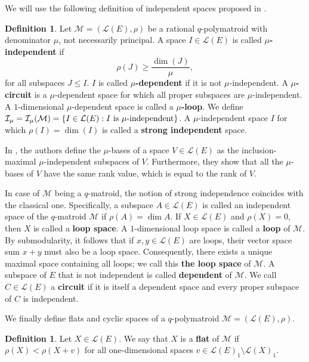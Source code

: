 \documentclass[a4paper,11pt,reqno]{amsart}
\theoremstyle{definition}
\newtheorem{definition}[theorem]{{{Definition}}}
\newcommand{\mM}{\mathcal{M}}
\newcommand{\mL}{\mathcal{L}}
\begin{document}
{We will use the following definition of independent spaces proposed in \cite[Def. 3.1]{gluesing2022independent}. 

\begin{definition}\label{def:indep_spaces}
Let $\mM = (\mL(E), \rho)$ be a rational $q$-polymatroid with denominator $\mu$, not necessarily principal.  A space $I\in\mL(E)$ is called \textbf{$\mu$-independent} if
$$\rho(J)\geq \frac{\dim(J)}{\mu},$$ 
for all subspaces $J\leq I$.
$I$ is called \textbf{$\mu$-dependent} if it is not $\mu$-independent. A \textbf{$\mu$-circuit} is a $\mu$-dependent space for which all proper subspaces are $\mu$-independent. A $1$-dimensional $\mu$-dependent space is called a \textbf{$\mu$-loop}. We define $\mathcal{I}_\mu=\mathcal{I}_\mu(\mathcal{M}) = \{I \in\mL(E) : I \textnormal{ is } \mu\textnormal{-independent}\}$. 
A $\mu$-independent space $I$ for which $\rho(I)=\dim(I)$ is called a \textbf{strong independent} space.
\end{definition}

In \cite[Def. 3.8]{gluesing2022independent}, the authors define the $\mu$-bases of a space $V\in\mL(E)$ as the inclusion-maximal $\mu$-independent subspaces of $V$. Furthermore, they show that all the $\mu$-bases of $V$ have the same rank value, which is equal to the rank of $V$.

In case of $\mM$ being a $q$-matroid, the notion of strong independence coincides with the classical one. Specifically, a subspace $A \in \mathcal{L}(E)$ is called an independent space of the $q$-matroid $\mathcal{M}$ if $\rho(A) = \dim A$. If $X \in \mL(E)$ and $\rho(X) = 0$, then $X$ is called a \textbf{loop space}. A $1$-dimensional loop space is called a \textbf{loop} of $\mathcal{M}$. By submodularity, it follows that if $x, y \in\mL(E)$ are loops, their vector space sum $x+y$ must also be a loop space. Consequently, there exists a unique maximal space containing all loops; we call this \textbf{the loop space} of $\mathcal{M}$.
A subspace of $E$ that is not independent is called {\bf dependent} of $\mM$. We call $C \in \mL(E)$ a {\bf circuit} if it is itself a dependent space and every proper subspace of $C$ is independent. 

We finally define flats and cyclic spaces of a $q$-polymatroid $\mM=(\mL(E),\rho)$. 

\begin{definition}\label{def:flats}
    Let $X\in\mL(E)$. We say that $X$ is a \textbf{flat} of $\mM$ if $\rho(X)<\rho(X+ v)$ for all one-dimensional spaces $ v\in\mL(E)_1\setminus \mL(X)_1$.
\end{definition}

}
\end{document}
